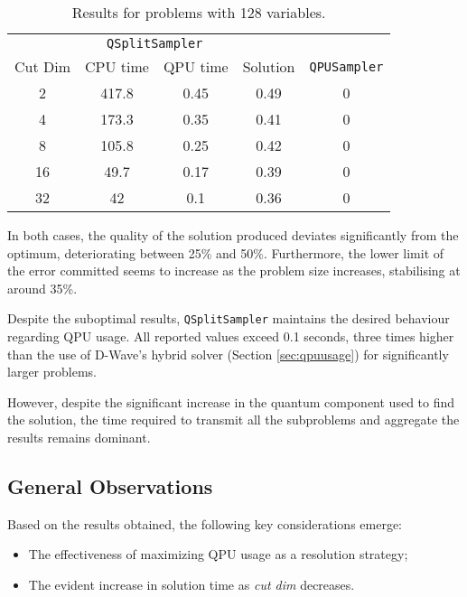 \begin{table}[H]
    \centering
    \begin{tabular}{cccc|c}
        \toprule
        \multicolumn{4}{c}{\texttt{QSplitSampler}} & \\
        Cut Dim         & CPU time & QPU time & Solution & \texttt{QPUSampler}  \\
        \midrule
        2               & 417.8    & 0.45     & 0.49     & 0        \\
        4               & 173.3    & 0.35     & 0.41     & 0        \\
        8               & 105.8    & 0.25     & 0.42     & 0        \\
        16              & 49.7     & 0.17     & 0.39     & 0        \\
        32              & 42       & 0.1      & 0.36     & 0        \\
        \bottomrule
    \end{tabular}
    \caption{Results for problems with 128 variables.}
    \label{tab:128var}
\end{table}

In both cases, the quality of the solution produced deviates significantly from the optimum, deteriorating between 25\% and 50\%. 
Furthermore, the lower limit of the error committed seems to increase as the problem size increases, stabilising at around 35\%.

Despite the suboptimal results, \texttt{QSplitSampler} maintains the desired behaviour regarding QPU usage. 
All reported values exceed 0.1 seconds, three times higher than the use of D-Wave's hybrid solver (Section \ref{sec:qpuusage}) for significantly larger problems.

However, despite the significant increase in the quantum component used to find the solution, the time required to transmit all the subproblems and aggregate the results remains dominant.

\subsection{General Observations}\label{sec:yqsplit}

Based on the results obtained, the following key considerations emerge: 
\begin{itemize} 
    \item The effectiveness of maximizing QPU usage as a resolution strategy; 
    \item The evident increase in solution time as \emph{cut dim} decreases. 
\end{itemize}

